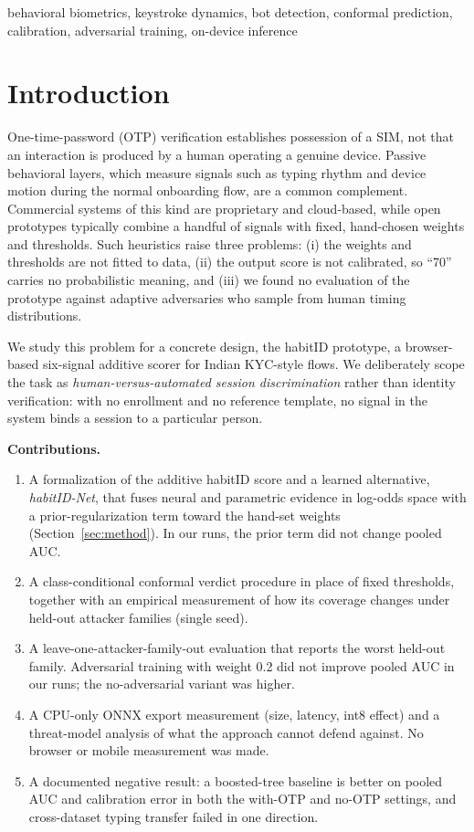 \documentclass[conference]{IEEEtran}
\newcommand{\hid}{habitID}
\begin{document}
\begin{IEEEkeywords}
behavioral biometrics, keystroke dynamics, bot detection, conformal prediction, calibration, adversarial training, on-device inference
\end{IEEEkeywords}

\section{Introduction}
One-time-password (OTP) verification establishes possession of a SIM, not that an interaction is produced by a human operating a genuine device. Passive behavioral layers, which measure signals such as typing rhythm and device motion during the normal onboarding flow, are a common complement. Commercial systems of this kind are proprietary and cloud-based, while open prototypes typically combine a handful of signals with fixed, hand-chosen weights and thresholds. Such heuristics raise three problems: (i) the weights and thresholds are not fitted to data, (ii) the output score is not calibrated, so ``70'' carries no probabilistic meaning, and (iii) we found no evaluation of the prototype against adaptive adversaries who sample from human timing distributions.

We study this problem for a concrete design, the \hid{} prototype, a browser-based six-signal additive scorer for Indian KYC-style flows. We deliberately scope the task as \emph{human-versus-automated session discrimination} rather than identity verification: with no enrollment and no reference template, no signal in the system binds a session to a particular person.

\textbf{Contributions.}
\begin{enumerate}
\item A formalization of the additive \hid{} score and a learned alternative, \emph{habitID-Net}, that fuses neural and parametric evidence in log-odds space with a prior-regularization term toward the hand-set weights (Section~\ref{sec:method}). In our runs, the prior term did not change pooled AUC.
\item A class-conditional conformal verdict procedure in place of fixed thresholds, together with an empirical measurement of how its coverage changes under held-out attacker families (single seed).
\item A leave-one-attacker-family-out evaluation that reports the worst held-out family. Adversarial training with weight 0.2 did not improve pooled AUC in our runs; the no-adversarial variant was higher.
\item A CPU-only ONNX export measurement (size, latency, int8 effect) and a threat-model analysis of what the approach cannot defend against. No browser or mobile measurement was made.
\item A documented negative result: a boosted-tree baseline is better on pooled AUC and calibration error in both the with-OTP and no-OTP settings, and cross-dataset typing transfer failed in one direction.
\end{enumerate}
\end{document}
